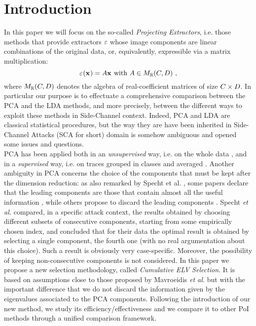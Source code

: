 \section{Introduction}

In this paper we will focus on the so-called {\em Projecting Extractors}, i.e. those methods that provide extractors $\extract$ whose image components are linear combinations of the original data, or, equivalently, expressible via a matrix multiplication:
\begin{equation}
\extractor{\sss[]{}} = A\sss[]{} \mbox{ with } A \in M_{\mathbb{R}}(\newTraceLength, \traceLength) \mbox{ ,}
\end{equation}
where $ M_{\mathbb{R}}(\newTraceLength, \traceLength)$ denotes the algebra of real-coefficient matrices of size $\newTraceLength \times \traceLength$.  In particular our purpose is to effectuate a comprehensive comparison  between the PCA and the LDA methods, and more precisely, between the different ways to exploit these methods in Side-Channel context. Indeed, PCA and LDA are classical statistical procedures, but the way they are have been inherited in Side-Channel Attacks (SCA for short) domain is somehow ambiguous and opened some issues and questions.\\
PCA has been applied both in an {\em unsupervised} way, i.e. on the whole data \cite{Batina2012,karsmakers2009side}, and in a {\em supervised} way, i.e. on traces grouped in classes and averaged \cite{TAprincipal,choudaryefficient,choudary2014efficient,disassembler,Standaert2008}. Another ambiguity in PCA concerns the choice of the components that must be kept after the dimension reduction: as also remarked by Specht et al. \cite{}, some papers declare that the leading components are those that contain almost all the useful information \cite{TAprincipal}, while others propose to discard the leading components \cite{Batina2012}. Specht \textit{et al.} compared, in a specific attack context, the results obtained by choosing different subsets of consecutive components, starting from some empirically chosen index, and concluded that for their data the optimal result is obtained by selecting a single component, the fourth one (with no real argumentation about this choice). Such a result is obviously very case-specific. Moreover, the possibility of keeping non-consecutive components is not considered. In this paper we propose a new selection methodology, called {\em Cumulative ELV Selection}. It is based on assumptions close to those proposed by Mavroeidis \textit{et al.} \cite{SCAclassProbl} but with the important difference that we do not discard the information given by the eigenvalues associated to the PCA components. Following the introduction of our new method, we study its efficiency/effectiveness and we compare it to other PoI methods through a unified comparison framework. \\
